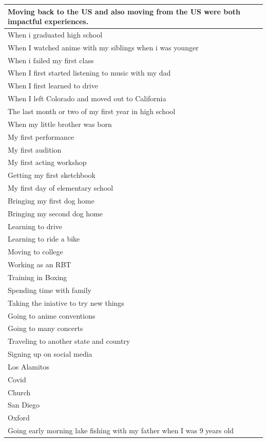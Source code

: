 \documentclass[
  .7em,
  letterpaper,
  DIV=11,
  numbers=noendperiod]{scrartcl}
\begin{document}
\begin{table}
\begin{tabular}{l}
\hline
Moving back to the US and also moving from the US were both impactful experiences.\\
\hline
When i graduated high school\\
\hline
When I watched anime with my siblings when i was younger\\
\hline
When i failed my first class\\
\hline
When I first started listening to music with my dad\\
\hline
When I first learned to drive\\
\hline
When I left Colorado and moved out to California\\
\hline
The last month or two of my first year in high school\\
\hline
When my little brother was born\\
\hline
My first performance\\
\hline
My first audition\\
\hline
My first acting workshop\\
\hline
Getting my first sketchbook\\
\hline
My first day of elementary school\\
\hline
Bringing my first dog home\\
\hline
Bringing my second dog home\\
\hline
Learning to drive\\
\hline
Learning to ride a bike\\
\hline
Moving to college\\
\hline
Working as an RBT\\
\hline
Training in Boxing\\
\hline
Spending time with family\\
\hline
Taking the iniative to try new things\\
\hline
Going to anime conventions\\
\hline
Going to many concerts\\
\hline
Traveling to another state and country\\
\hline
Signing up on social media\\
\hline
Los Alamitos\\
\hline
Covid\\
\hline
Church\\
\hline
San Diego\\
\hline
Oxford\\
\hline
Going early morning lake fishing with my father when I was 9 years old\\

\end{tabular}
\end{table}
\end{document}
